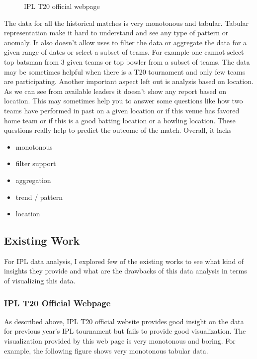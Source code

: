 \documentclass[sigconf]{acmart}
\begin{document}
\begin{figure}[htbp]
\centering
{}
\caption{IPL T20 official webpage}
\label{fig:iplt20}
\end{figure}

The data for all the historical matches is very monotonous and tabular. Tabular representation
make it hard to understand and see any type of pattern or anomaly. It also doesn't allow uses to 
filter the data or aggregate the data for a given range of dates or select a subset of teams. For 
example one cannot select top batsman from 3 given teams or top bowler from a subset of teams.
The data may be sometimes helpful when there is a T20 tournament and only few teams are
participating. Another important aspect left out is analysis based on location. As we can see from 
available leaders it doesn't show any report based on location. This may sometimes help you
to answer some questions like how two teams have performed in past on a given location or if 
this venue has favored home team or if this is a good batting location or a bowling location. These
questions really help to predict the outcome of the match. 
Overall, it lacks
\begin{itemize}
\item monotonous
\item filter support
\item aggregation
\item trend / pattern
\item location
\end{itemize}

\subsection{Existing Work}
For IPL data analysis, I explored few of the existing works to see what kind of insights
they provide and what are the drawbacks of this data analysis in terms of visualizing this data.

\subsubsection{IPL T20 Official Webpage}

As described above, IPL T20\cite{www-iplt20} official website provides good insight on the 
data for previous year's IPL tournament but fails to provide good visualization. The visualization
provided by this web page is very monotonous and boring. For example, the following figure 
shows very monotonous tabular data.
\end{document}
